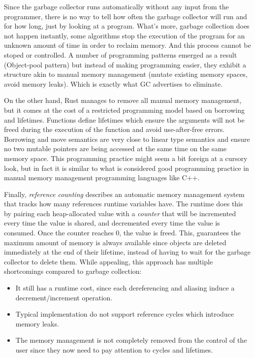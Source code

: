 \documentclass[
]{article}
\providecommand{\tightlist}{%
  \setlength{\itemsep}{0pt}\setlength{\parskip}{0pt}}
\begin{document}
Since the garbage collector runs automatically without any input from
the programmer, there is no way to tell how often the garbage collector
will run and for how long, just by looking at a program. What's more,
garbage collection does not happen instantly, some algorithms stop the
execution of the program for an unknown amount of time in order to
reclaim memory. And this process cannot be stoped or controlled. A
number of programming patterns emerged as a result (Object-pool pattern)
but instead of making programming easier, they exhibit a structure akin
to manual memory management (mutate existing memory spaces, avoid memory
leaks). Which is exactly what GC advertises to eliminate.

On the other hand, Rust \cite{rust} manages to remove all manual memory
management, but it comes at the cost of a restricted programming model
based on borrowing and lifetimes. Functions define lifetimes which
ensure the arguments will not be freed during the execution of the
function and avoid use-after-free errors. Borrowing and move semantics
are very close to linear type semantics and ensure no two mutable
pointers are being accessed at the same time on the same memory space.
This programming practice might seem a bit foreign at a cursory look,
but in fact it is similar to what is considered good programming
practice in manual memory management programming languages like C++.

Finally, \emph{reference counting} describes an automatic memory
management system that tracks how many references runtime variables
have. The runtime does this by pairing each heap-allocated value with a
\emph{counter} that will be incremented every time the value is shared,
and decremented every time the value is consumed. Once the counter
reaches 0, the value is freed. This, guarantees the maximum amount of
memory is always available since objects are deleted immediately at the
end of their lifetime, instead of having to wait for the garbage
collector to delete them. While appealing, this approach has multiple
shortcomings compared to garbage collection:

\begin{itemize}
\tightlist
\item
  It still has a runtime cost, since each dereferencing and aliasing
  induce a decrement/increment operation.
\item
  Typical implementation do not support reference cycles which introduce
  memory leaks.
\item
  The memory management is not completely removed from the control of
  the user since they now need to pay attention to cycles and lifetimes.
\end{itemize}
\end{document}
